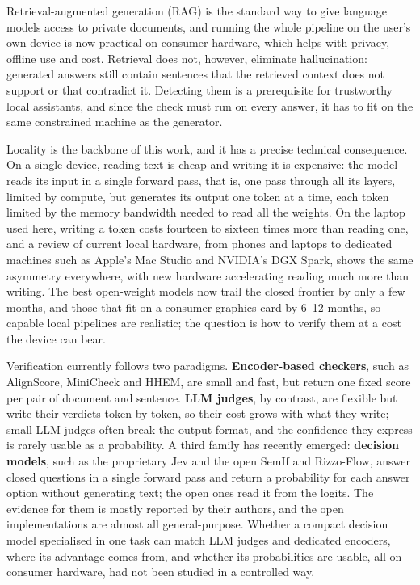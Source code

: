 
Retrieval-augmented generation (RAG) is the standard way to give language models access to private documents, and
running the whole pipeline on the user's own device is now practical on consumer hardware, which helps with privacy,
offline use and cost. Retrieval does not, however, eliminate hallucination: generated answers still contain sentences
that the retrieved context does not support or that contradict it. Detecting them is a prerequisite for trustworthy
local assistants, and since the check must run on every answer, it has to fit on the same constrained machine as the
generator.

Locality is the backbone of this work, and it has a precise technical consequence. On a single device, reading text is
cheap and writing it is expensive: the model reads its input in a single forward pass, that is, one pass through all its layers, limited by
compute, but generates its output one token
at a time, each token limited by the memory bandwidth needed to read all the weights. On the laptop used here, writing a
token costs fourteen to sixteen times more than reading one, and a review of current local hardware, from phones and
laptops to dedicated machines such as Apple's Mac Studio and NVIDIA's DGX Spark, shows the same asymmetry everywhere,
with new hardware accelerating reading much more than writing. The best open-weight models now trail the closed frontier
by only a few months, and those that fit on a consumer graphics card by 6--12 months, so capable local pipelines are
realistic; the question is how to verify them at a cost the device can bear.

Verification currently follows two paradigms. \textbf{Encoder-based checkers}, such as AlignScore, MiniCheck and HHEM, are small
and fast, but return one fixed score per pair of document and sentence. \textbf{LLM judges}, by contrast, are flexible but write their
verdicts token by token, so their cost grows with what they write; small LLM judges often break the output format, and the
confidence they express is rarely usable as a probability. A third family has recently emerged: \textbf{decision
models}, such as the proprietary Jev and the open SemIf and Rizzo-Flow, answer closed questions in a single forward pass and return a probability for each answer option without generating text; the open ones read it from the logits. The evidence for them is mostly reported by their
authors, and the open implementations are almost all general-purpose. Whether a compact decision model specialised in one task can match
LLM judges and dedicated encoders, where its advantage comes from, and whether its probabilities are usable, all
on consumer hardware, had not been studied in a controlled way.

